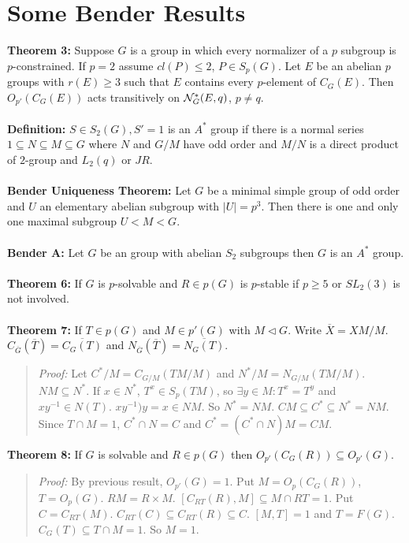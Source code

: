 \section{Some Bender Results}
{\bf Theorem 3:} Suppose $G$ is a group in which every normalizer of a $p$ subgroup is $p$-constrained.
If $p=2$ assume $cl(P) \leq 2$, $P \in S_p(G)$.  Let $E$ be an abelian $p$ groups with $r(E) \geq 3$ such that
$E$ contains every $p$-element of $C_G(E)$.  Then $O_{p'}(C_G(E))$ acts transitively on ${\cal N}_G^*(E,q)$,
$p \ne q$.
\\
\\
{\bf Definition:} $S \in S_2(G), S' = 1$ is an $A^*$ group if there is a normal series $1 \subseteq N \subseteq M \subseteq G$ where $N$ and $G/M$ have odd order and $M/N$
is a direct product of $2$-group and $L_2(q)$ or $JR$.
\\
\\
{\bf Bender Uniqueness Theorem:} Let $G$ be a minimal simple group of odd order and $U$ an elementary
abelian subgroup with $|U|=p^3$.   Then there is one and only one maximal subgroup $U<M<G$.
\\
\\
{\bf Bender A:} Let $G$ be an group with abelian $S_2$ subgroups then $G$ is an $A^*$ group.
\\
\\
{\bf Theorem 6:} If $G$ is $p$-solvable and $R \in p(G)$ is $p$-stable if $p \geq 5$ or $SL_2(3)$ is not involved.
\\
\\
{\bf Theorem 7:} If $T \in p(G)$ and $M \in p'(G)$ with $M \lhd G$.  Write ${\overline X} = XM/M$.
$C_{\overline G}({\overline T}) = {\overline {C_G(T)}}$ and
$N_{\overline G}({\overline T}) = {\overline {N_G(T)}}$.
\begin{quote}
\emph{Proof:}
Let $C^*/M = C_{G/M}(TM/M)$ and $N^*/M =N_{G/M}(TM/M)$.  $NM \subseteq N^*$. If $x \in N^*$, $T^x \in S_p(TM)$,
so $\exists y \in M: T^x= T^y$ and $x y^{-1} \in N(T)$.  $x y^{-1})y = x \in NM$. So
$N^* = NM$.  $CM \subseteq C^* \subseteq N^*= NM$.  Since $T \cap M = 1$, $C^* \cap N = C$ and
$C^*=(C^* \cap N)M=CM$.
\end{quote}
{\bf Theorem 8:} If $G$ is solvable and $R \in p(G)$ then $O_{p'}(C_G(R)) \subseteq O_{p'}(G)$.
\begin{quote}
\emph{Proof:}  By previous result, $O_{p'}(G)=1$.  Put $M=O_p(C_G(R))$, $T= O_p(G)$.  $RM= R \times M$.
$[C_{RT}(R), M] \subseteq M \cap RT = 1$.  Put $C=C_{RT}(M)$.  $C_{RT}(C) \subseteq C_{RT}(R) \subseteq C$.
$[M, T]=1$ and $T= F(G)$.  $C_G(T) \subseteq T \cap M =1$.  So $M = 1$.
\end{quote}
